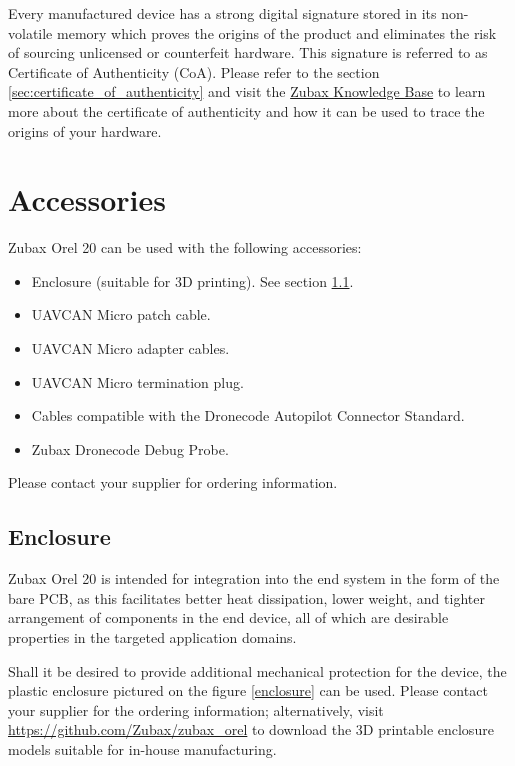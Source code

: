 \documentclass{zubaxdoc}
\begin{document}
Every manufactured device has a strong digital signature stored in its non-volatile memory
which proves the origins of the product and eliminates the risk of sourcing unlicensed or
counterfeit hardware.
This signature is referred to as Certificate of Authenticity (CoA).
Please refer to the section \ref{sec:certificate_of_authenticity} and visit the
\href{https://kb.zubax.com}{Zubax Knowledge Base} to learn more about
the certificate of authenticity and how it can be used to trace the origins of your hardware.

\section{Accessories}

Zubax Orel 20 can be used with the following accessories:

\begin{itemize}
    \item Enclosure (suitable for 3D printing). See section \ref{sec:enclosure}.
    \item UAVCAN Micro patch cable.
    \item UAVCAN Micro adapter cables.
    \item UAVCAN Micro termination plug.
    \item Cables compatible with the Dronecode Autopilot Connector Standard.
    \item Zubax Dronecode Debug Probe.
\end{itemize}

Please contact your supplier for ordering information.

\subsection{Enclosure}\label{sec:enclosure}

Zubax Orel 20 is intended for integration into the end system in the form of the bare PCB,
as this facilitates better heat dissipation, lower weight, and tighter arrangement of components
in the end device, all of which are desirable properties in the targeted application domains.

Shall it be desired to provide additional mechanical protection for the device,
the plastic enclosure pictured on the figure \ref{enclosure} can be used.
Please contact your supplier for the ordering information;
alternatively, visit \url{https://github.com/Zubax/zubax_orel} to download
the 3D printable enclosure models suitable for in-house manufacturing.
\end{document}
